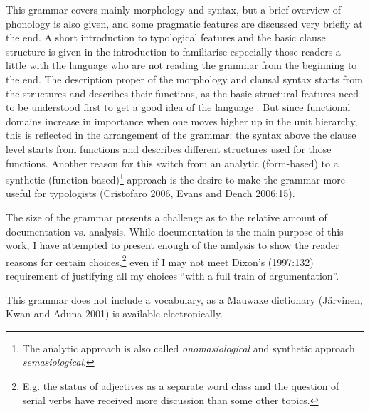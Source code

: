This grammar covers mainly morphology and syntax, but a brief overview of phonology is also given, and some pragmatic features are discussed very briefly at the end. A short introduction to typological features and the basic clause structure is given in the introduction to familiarise especially those readers a little with the language who are not reading the grammar from the beginning to the end. The description proper of  the morphology and clausal syntax starts from the structures and describes their functions, as the basic structural features need to be understood first to get a good idea of the language \citep[59]{Mosel2006}. But since functional domains increase in importance when one moves higher up in the unit hierarchy, this is reflected in the arrangement of the grammar: the syntax above the clause level starts from functions and describes different structures used for those functions. Another reason for this switch from an analytic (form-based) to a synthetic (function-based)\footnote{The analytic approach is also called \textit{onomasiological} and synthetic approach \textit{semasiological}.}  approach is the desire to make the grammar more useful for typologists (Cristofaro 2006, Evans and Dench 2006:15). 

The size of the grammar presents a challenge as to the relative amount of documentation vs. analysis.  While documentation is the main purpose of this work, I have attempted to present enough of the analysis to show the reader reasons for certain choices,\footnote{E.g. the status of adjectives as a separate word class and the question of serial verbs have received more discussion than some other topics.} even if I may not meet Dixon's (1997:132) requirement of justifying all my choices ``with a full train of argumentation''. 

This grammar does not include a vocabulary, as a Mauwake dictionary (J\"arvinen, Kwan and Aduna 2001) is available electronically.

